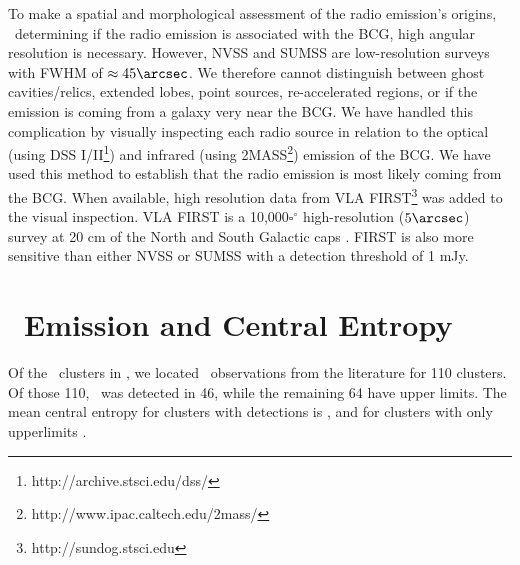 \documentclass[12pt,preprint]{aastex}
\begin{document}
To make a spatial and morphological assessment of the radio emission's
origins, \ie\ determining if the radio emission is associated with the
BCG, high angular resolution is necessary. However, NVSS and SUMSS are
low-resolution surveys with FWHM of $\approx 45\arcsec$. We therefore
cannot distinguish between ghost cavities/relics, extended lobes,
point sources, re-accelerated regions, or if the emission is coming
from a galaxy very near the BCG. We have handled this complication by
visually inspecting each radio source in relation to the optical
(using DSS I/II\footnote{http://archive.stsci.edu/dss/}) and infrared
(using 2MASS\footnote{http://www.ipac.caltech.edu/2mass/}) emission of
the BCG. We have used this method to establish that the radio emission
is most likely coming from the BCG. When available, high resolution
data from VLA FIRST\footnote{http://sundog.stsci.edu} was added to the
visual inspection. VLA FIRST is a 10,000$\square^\circ$
high-resolution ($5\arcsec$) survey at 20 cm of the North and South
Galactic caps \citep{first}. FIRST is also more sensitive than either
NVSS or SUMSS with a detection threshold of 1 mJy.

\section{\halpha\ Emission and Central Entropy}
\label{sec:sf}

Of the \clnum\ clusters in \accept, we located \halpha\ observations
from the literature for 110 clusters. Of those 110, \halpha\ was
detected in 46, while the remaining 64 have upper limits. The mean
central entropy for clusters with detections is \fha, and for clusters
with only upperlimits \nfha.
\end{document}
